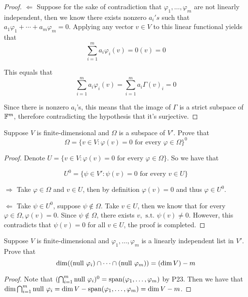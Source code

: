 \documentclass{extarticle}
\begin{document}
\begin{proof}
\(\Leftarrow\) Suppose for the sake of contradiction that \(\varphi_1, \ldots, \varphi_m\) are not linearly 
independent, then we know there exists nonzero \(a_i's\) such that \(a_1 \varphi_1 + \cdots + a_m 
\varphi_m = 0\). Applying any vector \(v \in V\) to this linear functional yields that 
\[\sum_{i=1}^{m}a_i \varphi_i (v) = 0(v) = 0\]

This equals that 
\[\sum_{i=1}^{m}a_i \varphi_i (v) = \sum_{i=1}^{m}a_i \Gamma(v)_i = 0\]

Since there is nonzero \(a_i\)'s, this means that the image of \(\Gamma\) is a strict subspace 
of \(\mathbb{F}^m\), therefore contradicting the hypothesis that it's surjective.
\end{proof}

\begin{problem}{26}
    Suppose \(V\) is finite-dimensional and \(\Omega\) is a subspace of \(V'\). Prove that 
    \[\Omega = \{v \in V \colon \varphi(v) = 0 \text{ for every } \varphi \in \Omega\}^0\]
\end{problem}

\begin{proof}
Denote \(U = \{v \in V \colon \varphi(v) = 0 \text{ for every } \varphi \in \Omega\}\). 
So we have that 

\[U^0 = \{\psi\in V' \colon \psi(v) = 0 \text{ for every } v \in U\}\]

\(\Rightarrow\) Take \(\varphi \in \Omega\) and \(v \in U\), then by definition \(\varphi(v) = 0\)
and thus \(\varphi \in U^0\). 

\(\Leftarrow\) Take \(\psi \in U^0\), suppose \(\psi\notin \Omega\). Take \(v \in U\), then we know 
that for every \(\varphi \in \Omega, \varphi(v) = 0\). Since \(\psi \notin \Omega\), there 
exists \(v, \text{ s.t. }\psi(v) \neq 0\). However, this contradicts that \(\psi(v) = 0\) for all 
\(v \in U\), the proof is completed.  
\end{proof}

\begin{problem}{28}
    Suppose \(V\) is finite-dimensional and \(\varphi_1, \ldots, \varphi_m\) is a linearly independent 
    list in \(V'\). Prove that 
    \[\dim((\text{null } \varphi_i) \cap \cdots \cap (\text{null } \varphi_m)) = (\dim V) - m\]
\end{problem}

\begin{proof}
Note that \((\bigcap_{i=1}^m \text{null } \varphi_i)^0 = \text{span}(\varphi_1, \ldots, \varphi_m)\) by P23. Then 
we have that \(\dim \bigcap_{i=1}^m \text{null } \varphi_i = \dim V - \text{span}(\varphi_1, \ldots, \varphi_m)  
= \dim V - m\). 
\end{proof}
\end{document}

